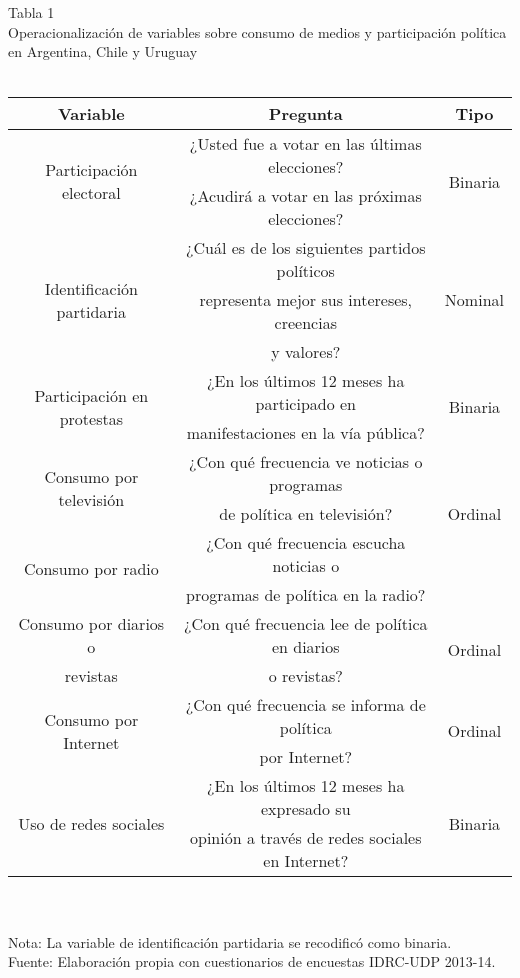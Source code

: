\documentclass[a4paper]{tufte-handout}
\begin{document}
\begin{table*}[h]
  \centering
  \selectfont
   \smallskip\noindent\small Tabla 1 \\ Operacionalización de variables sobre consumo de medios y participación política en Argentina, Chile y Uruguay \\~\\
  \begin{tabular}{c c c}
    \toprule
    Variable & Pregunta & Tipo \\
    \midrule
    \multirow{2}{*}{Participación electoral} & ¿Usted fue a votar en las últimas elecciones?  & \multirow{2}{*}{Binaria}\\
    & ¿Acudirá a votar en las próximas elecciones? & \\ \midrule
    \multirow{3}{*}{Identificación partidaria} & ¿Cuál es de los siguientes partidos políticos & \multirow{3}{*}{Nominal}\\
    & representa mejor sus intereses, creencias & \\
    & y valores? & \\ \midrule
    \multirow{2}{*}{Participación en protestas} & ¿En los últimos 12 meses ha participado en & \multirow{2}{*}{Binaria} \\
    & manifestaciones en la vía pública? & \\ \midrule
    \multirow{2}{*}{Consumo por televisión} & ¿Con qué frecuencia ve noticias o programas & \multirow{3}{*}{Ordinal}  \\
    & de política en televisión? & \\ \midrule
    \multirow{2}{*}{Consumo por radio} & ¿Con qué frecuencia escucha noticias o &  \multirow{2}{*}{Ordinal} \\
    & programas de política en la radio? & \\ \midrule
    Consumo por diarios o & ¿Con qué frecuencia lee de política en diarios & \multirow{2}{*}{Ordinal} \\
    revistas & o revistas?  & \\ \midrule
    \multirow{2}{*}{Consumo por Internet} & ¿Con qué frecuencia se informa de política & \multirow{2}{*}{Ordinal} \\
    & por Internet? & \\ \midrule
    \multirow{2}{*}{Uso de redes sociales} & ¿En los últimos 12 meses ha expresado su & \multirow{2}{*}{Binaria} \\
    & opinión a través de redes sociales en Internet? & \\ \bottomrule
  \end{tabular}
  \\~\\ \smallskip\noindent\scriptsize Nota: La variable de identificación partidaria se recodificó como binaria. \\ Fuente: Elaboración propia con cuestionarios de encuestas IDRC-UDP 2013-14.
\end{table*}
\end{document}
